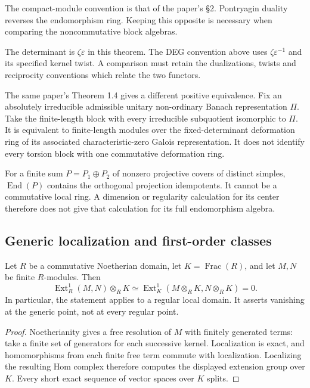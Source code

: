 The compact-module convention is that of the paper's \S2.
Pontryagin duality reverses the endomorphism ring. Keeping this
opposite is necessary when comparing the noncommutative block algebras.

The determinant is \(\zeta\varepsilon\) in this theorem.
The DEG convention above uses \(\zeta\varepsilon^{-1}\) and its
specified kernel twist. A comparison must retain the dualizations,
twists and reciprocity conventions which relate the two functors.

The same paper's Theorem 1.4 gives a different positive equivalence.
Fix an absolutely irreducible admissible unitary non-ordinary
Banach representation \(\Pi\). Take the finite-length block with
every irreducible subquotient isomorphic to \(\Pi\).
It is equivalent to finite-length modules over the fixed-determinant
deformation ring of its associated characteristic-zero Galois representation.
It does not identify every torsion block with one commutative
deformation ring.

For a finite sum \(P=P_1\oplus P_2\) of nonzero projective covers
of distinct simples, \(\operatorname{End}(P)\) contains the
orthogonal projection idempotents. It cannot be a commutative local
ring. A dimension or regularity calculation for its center therefore
does not give that calculation for its full endomorphism algebra.

\subsection{Generic localization and first-order classes}

\begin{proposition}
\label{v4-arith:ic:w5-f:F1a3-AB:prop:Ext1-generic-p5}
Let \(R\) be a commutative Noetherian domain, let
\(K=\operatorname{Frac}(R)\), and let \(M,N\) be finite \(R\)-modules.
Then
\[
 \operatorname{Ext}^1_R(M,N)\otimes_R K
 \simeq\operatorname{Ext}^1_K(M\otimes_R K,N\otimes_R K)=0.
\]
In particular, the statement applies to a regular local domain.
It asserts vanishing at the generic point, not at every regular point.
\end{proposition}
\begin{proof}
Noetherianity gives a free resolution of \(M\) with finitely generated
terms: take a finite set of generators for each successive kernel.
Localization is exact, and homomorphisms from each finite free term
commute with localization. Localizing the resulting Hom complex
therefore computes the displayed extension group over \(K\).
Every short exact sequence of vector spaces over \(K\) splits.
\end{proof}

